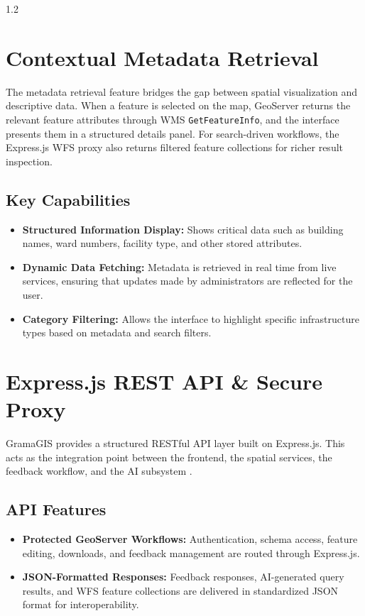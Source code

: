 \begin{spacing}{1.2}
\section{Contextual Metadata Retrieval}

The metadata retrieval feature bridges the gap between spatial visualization and descriptive data. When a feature is selected on the map, GeoServer returns the relevant feature attributes through WMS \texttt{GetFeatureInfo}, and the interface presents them in a structured details panel. For search-driven workflows, the Express.js WFS proxy also returns filtered feature collections for richer result inspection.

\subsection*{Key Capabilities}

\begin{itemize}
\item \textbf{Structured Information Display:} Shows critical data such as building names, ward numbers, facility type, and other stored attributes.
\item \textbf{Dynamic Data Fetching:} Metadata is retrieved in real time from live services, ensuring that updates made by administrators are reflected for the user.
\item \textbf{Category Filtering:} Allows the interface to highlight specific infrastructure types based on metadata and search filters.
\end{itemize}

\section{Express.js REST API \& Secure Proxy}

GramaGIS provides a structured RESTful API layer built on Express.js. This acts as the integration point between the frontend, the spatial services, the feedback workflow, and the AI subsystem \cite{fu2020webgis}.

\subsection*{API Features}

\begin{itemize}
\item \textbf{Protected GeoServer Workflows:} Authentication, schema access, feature editing, downloads, and feedback management are routed through Express.js.
\item \textbf{JSON-Formatted Responses:} Feedback responses, AI-generated query results, and WFS feature collections are delivered in standardized JSON format for interoperability.
\end{itemize}


\end{spacing}

